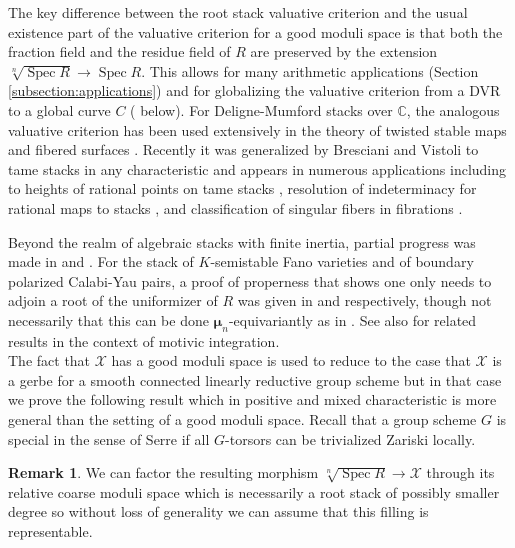 \documentclass{amsart}
\theoremstyle{definition}
\newtheorem{remark}[remark]{Remark}
\newcommand{\cX}{\mathcal{X}}
\newcommand{\bmu}{\pmb{\mu}}
\newcommand{\spec}{\operatorname{Spec}}
\begin{document}
The key difference between the root stack valuative criterion  and the usual existence part of the valuative criterion for a good moduli space \cite[Theorem A.8]{AHLH} is that both the fraction field and the residue field of $R$ are preserved by the extension $\sqrt[n]{\spec R} \to \spec R$. This allows for many arithmetic applications (Section \ref{subsection:applications}) and for globalizing the valuative criterion from a DVR to a global curve $C$ ( below). For Deligne-Mumford stacks over $\mathbb{C}$, the analogous valuative criterion has been used extensively in the theory of twisted stable maps \cite{AbramovichVistoli, ACV} and fibered surfaces \cite{MR3961332}. Recently it was generalized by Bresciani and Vistoli \cite{bresciani2024arithmetic} to tame stacks in any characteristic and appears in numerous applications including to heights of rational points on tame stacks \cite{ESZB, bejleri2024heightmodulicyclotomicstacks, DardaYasuda}, resolution of indeterminacy for rational maps to stacks \cite{mjjeon}, and classification of singular fibers in fibrations \cite{javier_hyperelliptic}. 

Beyond the realm of algebraic stacks with finite inertia, partial progress was made in \cite[Theorem 3.9]{di2022degenerations} and \cite[Theorem 1.2]{effective}. For the stack of $K$-semistable Fano varieties and of boundary polarized Calabi-Yau pairs, a proof of properness that shows one only needs to adjoin a root of the uniformizer of $R$ was given in \cite{properness_kmoduli_new} and \cite[Remark 7.2]{ABBDILW} respectively, though not necessarily that this can be done $\bmu_n$-equivariantly as in . See also \cite{warped} for related results in the context of motivic integration. \\

The fact that $\cX$ has a good moduli space is used to reduce to the case that $\cX$ is a gerbe for a smooth connected linearly reductive group scheme but in that case we prove the following result which in positive and mixed characteristic is more general than the setting of a good moduli space. Recall that a group scheme $G$ is special in the sense of Serre if all $G$-torsors can be trivialized Zariski locally.

\begin{remark}\label{rem:representable} We can factor the resulting morphism $\sqrt[n]{\spec R} \to \cX$ through its relative coarse moduli space \cite[Theorem 3.1]{AOV} which is necessarily a root stack of possibly smaller degree \cite[Proposition 3.12]{bresciani2024arithmetic} so without loss of generality we can assume that this filling is representable. 
\end{remark}
\end{document}
